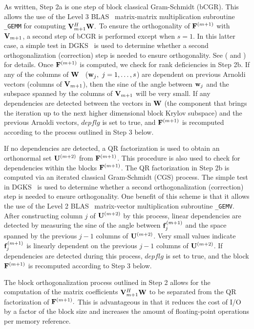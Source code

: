 \documentclass[twoside]{siamltex}
\newcommand{\bF}{{\bf F}}
\newcommand{\bV}{{\bf V}}
\newcommand{\bU}{{\bf U}}
\newcommand{\bW}{{\bf W}}
\newcommand{\bw}{{\bf w}}
\begin{document}
As written, Step 2a is one step of block classical Gram-Schmidt
(bCGR). This allows the use of the Level 3 {\small
BLAS}~\cite{dddh:90} matrix-matrix multiplication subroutine {\tt
\_GEMM} for computing $\bV_{m+1}^H \bW.$ To ensure the
orthogonality of $\bF^{(m+1)}$ with $\bV_{m+1}$, a second step of
bCGR is performed except when $s = 1$. In this latter case, a
simple test in DGKS~\cite{dgks:76} is used to determine whether a
second orthogonalization (correction) step is needed to ensure
orthogonality. See (\cite{lesy:98} and \cite{Le95}) for details.
Once $\bF^{(m+1)}$ is computed, we check for rank deficiencies in
Step 2b. If any of the columns of $\bW$~ ($\bw_j,~j=1,\ldots,s$)
are dependent on previous Arnoldi vectors (columns of
$\bV_{m+1}$), then the sine of the angle between $\bw_j$ and the
subspace spanned by the columns of $\bV_{m+1}$ will be very small.
If any dependencies are detected between the vectors in $\bW$ (the
component that brings the iteration up to the next higher
dimensional block Krylov subspace) and the previous Arnoldi
vectors, $depflg$ is set to true, and $\bF^{(m+1)}$ is recomputed
according to the process outlined in Step 3 below.

If no dependencies are detected, a QR factorization is used to
obtain an orthonormal set $\bU^{(m+2)}$ from $\bF^{(m+1)}$. This
procedure is also used to check for dependencies within the blocks
$\bF^{(m+1)}$. The QR factorization in Step 2b is computed via an
iterated classical Gram-Schmidt (CGS) process. The simple test in
DGKS~\cite{dgks:76} is used to determine whether a second
orthogonalization (correction) step is needed to ensure
orthogonality. One benefit of this scheme is that it allows the
use of the Level 2 {\small BLAS}~\cite{ddhh:88} matrix-vector
multiplication subroutine {\tt \_GEMV}. After constructing column
$j$ of $\bU^{(m+2)}$ by this process, linear dependencies are
detected by measuring the sine of the angle between ${\bf
f}_j^{(m+1)}$ and the space spanned by the previous $j-1$ columns
of $\bU^{(m+2)}$. Very small values indicate ${\bf f}_j^{(m+1)}$
is linearly dependent on the previous $j-1$ columns of
$\bU^{(m+2)}$. If dependencies are detected during this process,
$depflg$ is set to true, and the block $\bF^{(m+1)}$ is recomputed
according to Step 3 below.

The block orthogonalization process outlined in Step 2 allows for
the computation of the matrix coefficients $\bV_{m+1}^H \bW$ to be
separated from the QR factorization of $\bF^{(m+1)}.$ This is
advantageous in that it reduces the cost of I/O by a factor of the
block size and increases the amount of floating-point operations
per memory reference.
\end{document}
